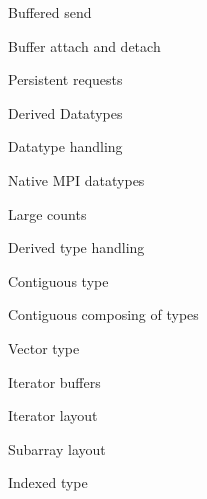 \documentclass[10pt]{beamer}
\begin{document}
\begin{numberedframe}{Buffered send}
  
\end{numberedframe}
\begin{numberedframe}{Buffer attach and detach}
  
\end{numberedframe}
\begin{numberedframe}{Persistent requests}
  
\end{numberedframe}

 {Derived Datatypes}

\begin{numberedframe}{Datatype handling}
  
\end{numberedframe}
\begin{numberedframe}{Native MPI datatypes}
  
\end{numberedframe}
\begin{numberedframe}{Large counts}
    
\end{numberedframe}
\begin{numberedframe}{Derived type handling}
  
\end{numberedframe}
\begin{numberedframe}{Contiguous type}
  
\end{numberedframe}
\begin{numberedframe}{Contiguous composing of types}
  
\end{numberedframe}
\begin{numberedframe}{Vector type}
  
\end{numberedframe}
\begin{numberedframe}{Iterator buffers}
  
\end{numberedframe}
\begin{numberedframe}{Iterator layout}
  
\end{numberedframe}
\begin{numberedframe}{Subarray layout}
  
\end{numberedframe}
\begin{numberedframe}{Indexed type}
  
\end{numberedframe}
\end{document}
